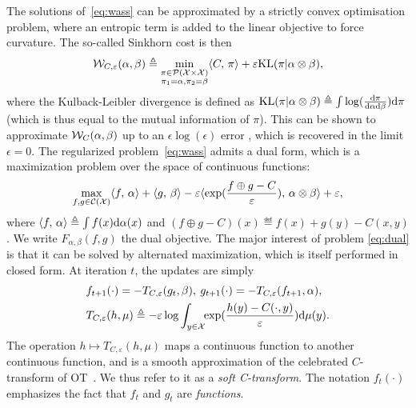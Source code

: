 The solutions of~\eqref{eq:wass} can be approximated by a strictly convex optimisation problem, where an entropic term is added to the linear objective to force curvature. The so-called Sinkhorn cost is then
\begin{equation}\label{eq:wass}
    \mathcal{W}_{C,\varepsilon}(\alpha, \beta) \triangleq 
    \min_{
    \substack{
        \pi \in \mathcal{P}(\mathcal{X} \times \mathcal{X})
        \\\pi_1 = \alpha, \pi_2 = \beta
    }    
    } \langle C,\,\pi\rangle + \varepsilon \textrm{KL}(\pi | \alpha \otimes \beta),
\end{equation}
where the Kulback-Leibler divergence is defined as $\textrm{KL}(\pi | \alpha \otimes
\beta) \triangleq \int \log(\frac{\textrm{d}\pi}{\textrm{d}\alpha\textrm{d}\beta}) \textrm{d}\pi$ (which is thus equal to
the mutual information of $\pi$).
%
This can be shown to approximate $\mathcal{W}_C(\alpha,\beta)$  up to an $\epsilon
\log(\epsilon)$ error \citep{2019-Genevay-aistats}, which is recovered in the
limit $\epsilon=0$. 
%
The regularized problem~\eqref{eq:wass} admits a dual form, which is a maximization problem over the space of continuous functions:
\begin{equation}\label{eq:dual}
    \max_{f, g \in \mathcal{C}(\mathcal{X})} \langle f,\,\alpha\rangle + \langle g,\,\beta\rangle
    - \varepsilon \langle \exp(\frac{f \oplus g - C}{\varepsilon}),\,\alpha \otimes \beta\rangle + \varepsilon, 
\end{equation}
where $\langle f,\,\alpha\rangle \triangleq \int f(x) \textrm{d}\alpha(x)$ and $(f \oplus g - C)(x)
\eqdef f(x)+g(y)-C(x,y)$. We write $F_{\alpha, \beta}(f, g)$ the dual objective. 
The major interest of problem \eqref{eq:dual} is that it can be solved by alternated maximization, which is itself performed in closed form. At iteration $t$, the updates are simply
\begin{align}
    &f_{t+1}(\cdot) = - T_{C,\varepsilon}(g_t, \beta), \:
    g_{t+1}(\cdot) = - T_{C,\varepsilon}(f_{t+1}, \alpha), \\
    &
    T_{C,\varepsilon}(h, \mu) \triangleq 
    - \varepsilon \log \int_{y \in \mathcal{X}}\!\! \exp(\frac{h(y) - C(\cdot, y)}{\varepsilon})\textrm{d} \mu(y).\label{eq:sinkhorn}
\end{align}
The operation $h \mapsto T_{C,\varepsilon}(h, \mu)$  maps a continuous function to another continuous function, and is a smooth approximation of the celebrated $C$-transform of OT~\cite{santambrogio2015optimal}. We thus refer to it as a \textit{soft C-transform}. 
%
The notation $f_t(\cdot)$ emphasizes the fact that $f_t$ and $g_t$ are \textit{functions}. 
%

